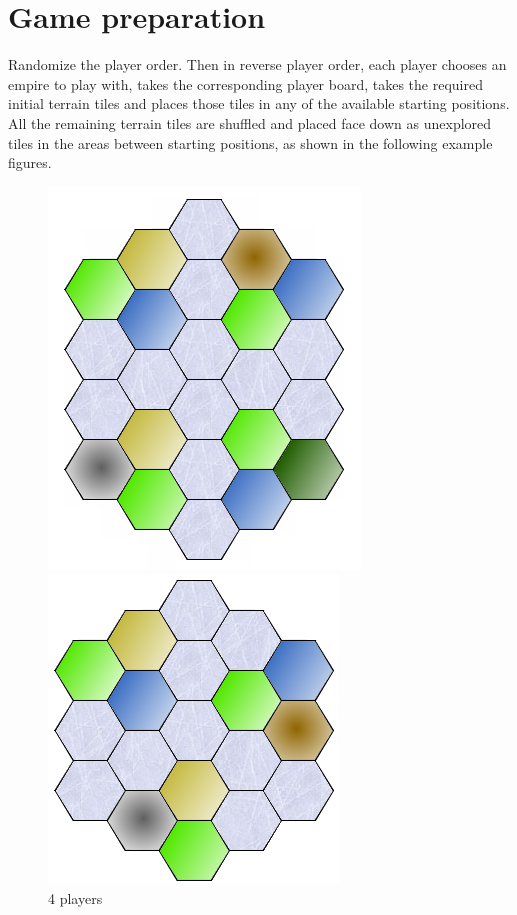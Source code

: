 \documentclass[11pt,a4paper,titlepage]{article}
\begin{document}
\section{Game preparation}{
  Randomize the player order. Then in reverse player order, each player
  chooses an empire to play with, takes the corresponding player board, takes
  the required initial terrain tiles and places those tiles in any of the
  available starting positions. All the remaining terrain tiles are shuffled
  and placed face down as unexplored tiles in the areas between starting
  positions, as shown in the following example figures.

  \begin{figure}[!htb]
    \begin{minipage}[c]{0.4\textwidth}
      \includegraphics[scale=.5]{doe_4p_setup.png}
      \captionsetup{labelformat=empty}
      \caption{4 players}
    \end{minipage}\hfill
    \begin{minipage}[c]{0.4\textwidth}
      \includegraphics[scale=.5]{doe_3p_setup.png}

\end{minipage}
\end{figure}}
\end{document}
